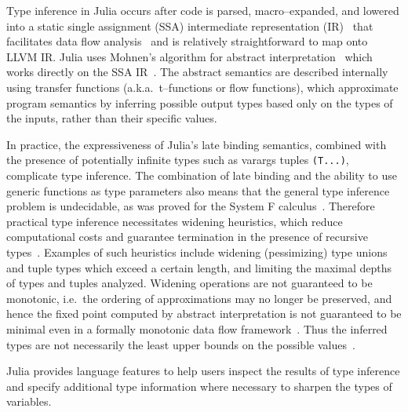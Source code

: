 \documentclass[pldi]{sigplanconf-pldi15}
\begin{document}
Type inference in Julia occurs after code is parsed, macro--expanded, and
lowered into a static single assignment (SSA) intermediate representation
(IR)~\cite{Alpern1988,Rosen1988} that facilitates data flow
analysis~\cite{Cousot1977,Cousot2000,Nielson2005} and is relatively
straightforward to map onto LLVM IR. Julia uses Mohnen's algorithm
for abstract interpretation~\cite{Cousot1992} which works directly on the SSA
IR~\cite{Mohnen2002}. The abstract semantics are described internally using
transfer functions (a.k.a.\ t--functions or flow functions), which approximate
program semantics by inferring possible output types based only on the types of
the inputs, rather than their specific values. 

In practice, the expressiveness of Julia's late binding semantics, combined
with the presence of potentially infinite types such as varargs tuples
\verb|(T...)|, complicate type inference. The combination of late binding and
the ability to use generic functions as type parameters also means that the
general type inference problem is undecidable, as was proved for the System F
calculus~\cite{Wells1999}. Therefore practical type inference necessitates
widening heuristics, which reduce computational costs and guarantee termination
in the presence of recursive types~\cite{Cousot1992a}. Examples of such
heuristics include widening (pessimizing) type unions and tuple types which
exceed a certain length, and limiting the maximal depths of types
and tuples analyzed. Widening operations are not guaranteed to be monotonic,
i.e.\ the ordering of approximations may no longer be preserved, and hence the
fixed point computed by abstract interpretation is not guaranteed to be
minimal even in a formally monotonic data flow framework~\cite{Cousot1992}.
Thus the inferred types are not necessarily the least upper bounds on the
possible values~\cite{Kaplan1977,Kaplan1980}.

Julia provides language features to help users inspect the results of type
inference and specify additional type information where necessary to sharpen
the types of variables.
\end{document}
